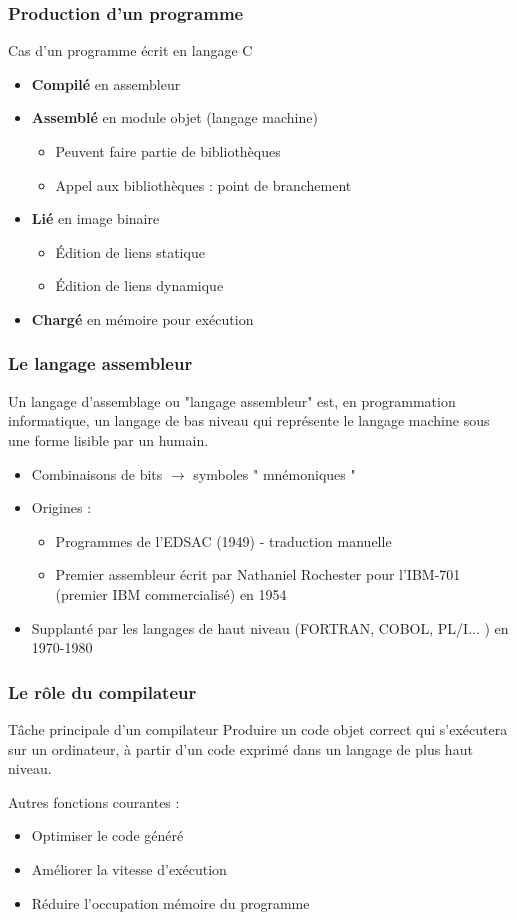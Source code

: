 \begin{frame}
\frametitle{Production d'un programme}
Cas d'un programme écrit en langage C
\begin{itemize}
\item \textbf{Compilé} en assembleur
\item \textbf{Assemblé} en module objet (langage machine)
\begin{itemize}
\item Peuvent faire partie de bibliothèques
\item Appel aux bibliothèques : point de branchement
\end{itemize}
\item \textbf{Lié} en image binaire
\begin{itemize}
\item Édition de liens statique
\item Édition de liens dynamique
\end{itemize}
\item \textbf{Chargé} en mémoire pour exécution
\end{itemize}
\end{frame}

\begin{frame}
\frametitle{Le langage assembleur \cite{wp-assembleur}}
\begin{definition}
Un langage d'assemblage ou "langage assembleur" est, en programmation informatique, un langage de bas niveau qui représente le langage machine sous une forme lisible par un humain.
\end{definition}
\begin{itemize}
\item Combinaisons de bits $\rightarrow$ symboles " mnémoniques "
\item Origines : \begin{itemize}
\item Programmes de l'EDSAC (1949) - traduction manuelle
\item Premier assembleur écrit par Nathaniel Rochester pour l'IBM-701 (premier IBM commercialisé) en 1954
\end{itemize}
\item Supplanté par les langages de haut niveau (FORTRAN, COBOL, PL/I... ) en 1970-1980
\end{itemize}

\end{frame}

\begin{frame}
\frametitle{Le rôle du compilateur}
\begin{block}{Tâche principale d'un compilateur}
Produire un code objet correct qui s'exécutera sur un ordinateur, à partir d'un code exprimé dans un langage de plus haut niveau.
\end{block}
Autres fonctions courantes :
\begin{itemize}
\item Optimiser le code généré
\item Améliorer la vitesse d'exécution
\item Réduire l'occupation mémoire du programme
\end{itemize}
\end{frame}

